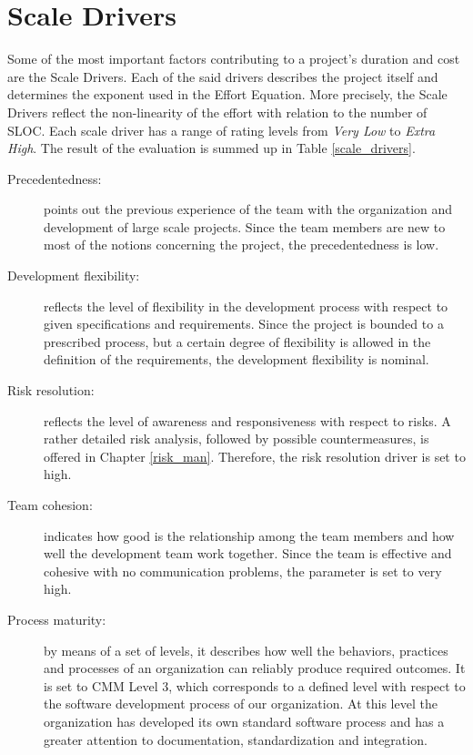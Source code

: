\section{Scale Drivers}
Some of the most important factors contributing to a project's duration and cost are the Scale Drivers. Each of the said drivers describes the project itself and determines the exponent used in the Effort Equation. More precisely, the Scale Drivers reflect the non-linearity of the effort with relation to the number of SLOC. Each scale driver has a range of rating levels from \textit{Very Low} to \textit{Extra High}. The result of the evaluation is summed up in Table \ref{scale_drivers}.

\begin{description}
\item[Precedentedness:] points out the previous experience of the team with the organization and development of large scale projects. Since the team members are new to most of the notions concerning the project, the precedentedness is low.
\item[Development flexibility:] reflects the level of flexibility in the development process with respect to given specifications and requirements. Since the project is bounded to a prescribed process, but a certain degree of flexibility is allowed in the definition of the requirements, the development flexibility is nominal.
\item[Risk resolution:] reflects the level of awareness and responsiveness with respect to risks. A rather detailed risk analysis, followed by possible countermeasures, is offered in Chapter \ref{risk_man}. Therefore, the risk resolution driver is set to high.
\item[Team cohesion:] indicates how good is the relationship among the team members and how well the development team work together. Since the team is effective and cohesive with no communication problems, the parameter is set to very high.
\item[Process maturity:] by means of a set of levels, it describes how well the behaviors, practices and processes of an organization can reliably produce required outcomes. It is set to CMM Level 3, which corresponds to a defined level with respect to the software development process of our organization. At this level the organization has developed its own standard software process and has a greater attention to documentation, standardization and integration.
\end{description}

